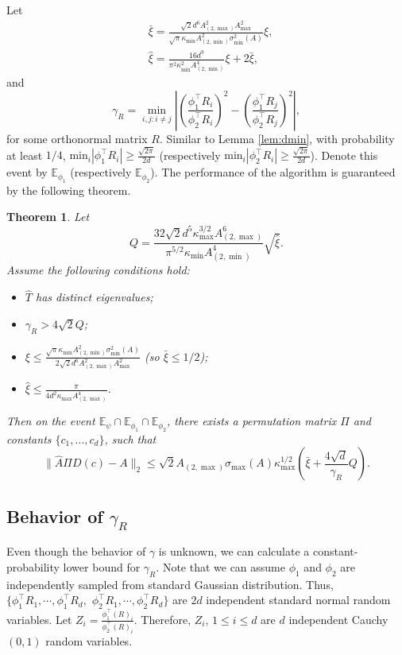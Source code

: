 \documentclass[twoside]{article}
\newcommand{\Ephione}{\mathbb{E}_{\phi_1}}
\newcommand{\Ephitwo}{\mathbb{E}_{\phi_2}}
\newcommand{\Epsi}{\mathbb{E}_{\psi}}
\newtheorem{thm}[lemma]{Theorem}
\theoremstyle{definition}
\begin{document}
Let 
\begin{align*}
& \bar{\xi} =   \frac{\sqrt{2}d^6A_{(2,\max)}^2A_{\max}^2}{\sqrt{\pi}\kappa_{\min}A^2_{(2,\min)}\sigma_{\min}^2(A)}\xi, \\
& \widehat{\xi} = \frac{16d^9}{\pi^2\kappa_{\min}^2A^4_{(2,\min)}}\xi + 2\bar{\xi},
\end{align*} 
and 
\begin{equation}
\label{def:gammaR}
\gamma_R =  \min_{i,j: i\neq j} \left\vert \left(\frac{\phi_1^{\top}R_i}{\phi_2^{\top}R_i}\right)^2 - \left(\frac{\phi_1^{\top}R_j}{\phi_2^{\top}R_j}\right)^2 \right\vert, 
\end{equation}
for some orthonormal matrix $R$.
Similar to Lemma \ref{lem:dmin}, with probability at least $1/4$, $\text{min}_i |\phi_1^{\top}R_i| \ge \frac{\sqrt{2\pi}}{2d}$ (respectively $\text{min}_i |\phi_2^{\top}R_i| \ge \frac{\sqrt{2\pi}}{2d}$). 
Denote this event by $\Ephione$ (respectively $\Ephitwo$).
The performance of the algorithm is guaranteed by the following theorem.
\begin{thm}
\label{thm:Modefficiency}
Let 
 \[ 
 Q=  \frac{32\sqrt{2}d^5\kappa^{3/2}_{\max}A^6_{(2,\max)}}{\pi^{5/2}\kappa_{\min}A^4_{(2,\min)}} \sqrt{\widehat{\xi}}.
 \] 
 Assume the following conditions hold:
 \begin{itemize}
 \item $\widehat{T}$ has distinct eigenvalues;
 \item $\gamma_R > 4\sqrt{2}Q$;
 \item $\xi \le \frac{\sqrt{\pi}\kappa_{\min}A^2_{(2,\min)}\sigma_{\min}^2(A)}{2\sqrt{2}d^6A_{(2,\max)}^2A_{\max}^2}$ (so $\bar{\xi} \le 1/2$);
 \item $\widehat{\xi} \le \frac{\pi}{4d^2\kappa_{\max}A^4_{(2,\max)}}$.
 \end{itemize}
Then on the event $\Epsi \cap \Ephione \cap \Ephitwo$, there exists a permutation matrix $\Pi$ and constants $\{c_1,\ldots,c_d\}$, such that 
\[
\|\widehat{A}\Pi D(c) - A\|_2 
\le 
\sqrt{2} A_{(2,\max)}\sigma_{\max}(A)\kappa_{\max}^{1/2} \left( \bar{\xi} + \frac{4\sqrt{d}}{\gamma_R}Q\right). 
\]
\end{thm}
\subsection{Behavior of $\gamma_R$}
\label{subsec:gammaR}
Even though the behavior of $\gamma$ is unknown, we can calculate a constant-probability lower bound for $\gamma_R$. 
Note that we can assume $\phi_1$ and $\phi_2$ are independently sampled from standard Gaussian distribution. 
Thus, $\{\phi_1^{\top}R_1, \cdots, \phi_1^{\top}R_d,$ $\phi_2^{\top}R_1, \cdots, \phi_2^{\top}R_d\}$ are $2d$ independent standard normal random variables. 
Let $Z_i = \frac{\phi_1^{\top}(R)_i}{\phi_2^{\top}(R)_i}$. Therefore, $Z_i$, $1\le i\le d$ are $d$ independent Cauchy$(0,1)$ random variables. 
\end{document}
